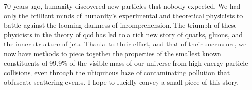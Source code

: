 70 years ago, humanity discovered new particles that nobody expected.
%
We had only the brilliant minds of humanity's experimental and theoretical physicists to battle against the looming darkness of incomprehension.
%
The triumph of these physicists in the theory of \gls{qcd} has led to a rich new story of quarks, gluons, and the inner structure of jets.
%
Thanks to their effort, and that of their successors, we now have methods to piece together the properties of the smallest known constituents of 99.9\% of the visible mass of our universe from high-energy particle collisions, even through the ubiquitous haze of contaminating pollution that obfuscate scattering events.
%
I hope to lucidly convey a small piece of this story.
